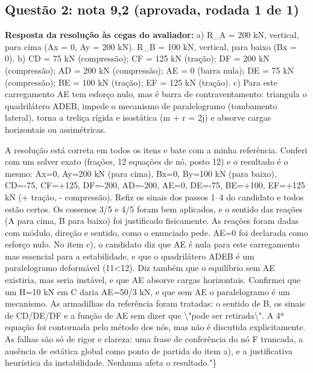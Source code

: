 \documentclass{article}%
\begin{document}
\subsection*{Questão 2: nota 9,2 (aprovada, rodada 1 de 1)}%
\textbf{Resposta da resolução às cegas do avaliador:} a) R\_A = 200 kN, vertical, para cima (Ax = 0, Ay = 200 kN). R\_B = 100 kN, vertical, para baixo (Bx = 0).\newline%
b) CD = 75 kN (compressão); CF = 125 kN (tração); DF = 200 kN (compressão); AD = 200 kN (compressão); AE = 0 (barra nula); DE = 75 kN (compressão); BE = 100 kN (tração); EF = 125 kN (tração).\newline%
c) Para este carregamento AE tem esforço nulo, mas é barra de contraventamento: triangula o quadrilátero ADEB, impede o mecanismo de paralelogramo (tombamento lateral), torna a treliça rígida e isostática (m + r = 2j) e absorve cargas horizontais ou assimétricas.\par %
A resolução está correta em todos os itens e bate com a minha referência. Conferi com um solver exato (frações, 12 equações de nó, posto 12) e o resultado é o mesmo: Ax=0, Ay=200 kN (para cima), Bx=0, By=100 kN (para baixo), CD=-75, CF=+125, DF=-200, AD=-200, AE=0, DE=-75, BE=+100, EF=+125 kN (+ tração, - compressão). Refiz os sinais dos passos 1--4 do candidato e todos estão certos. Os cossenos 3/5 e 4/5 foram bem aplicados, e o sentido das reações (A para cima, B para baixo) foi justificado fisicamente. As reações foram dadas com módulo, direção e sentido, como o enunciado pede. AE=0 foi declarada como esforço nulo. No item c), o candidato diz que AE é nula para este carregamento mas essencial para a estabilidade, e que o quadrilátero ADEB é um paralelogramo deformável (11<12). Diz também que o equilíbrio sem AE existiria, mas seria instável, e que AE absorve cargas horizontais. Confirmei que um H=10 kN em C daria AE=50/3 kN, e que sem AE o paralelogramo é um mecanismo. As armadilhas da referência foram tratadas: o sentido de B, os sinais de CD/DE/DF e a função de AE sem dizer que \textbackslash{}"pode ser retirada\textbackslash{}". A 4ª equação foi contornada pelo método dos nós, mas não é discutida explicitamente. As falhas são só de rigor e clareza: uma frase de conferência do nó F truncada, a ausência de estática global como ponto de partida do item a), e a justificativa heurística da instabilidade. Nenhuma afeta o resultado."\}%
\end{document}
